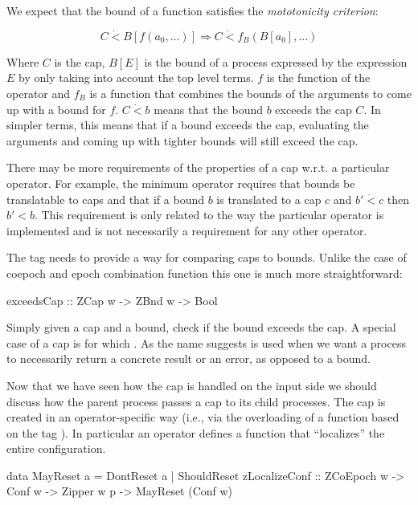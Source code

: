 We expect that the bound of a function satisfies the
\emph{mototonicity criterion}:

\[
C \dot{<} B[ f(a_0, ...)] \Rightarrow C \dot{<} f_B(B[a_0],...)
\]

Where \(C\) is the cap, \(B[E]\) is the bound of a process expressed
by the expression \(E\) by only taking into account the top level
terms. \(f\) is the function of the operator and \(f_B\) is a function
that combines the bounds of the arguments to come up with a bound for
\(f\). \(C \dot{<} b\) means that the bound \(b\) exceeds the cap
\(C\). In simpler terms, this means that if a bound exceeds the cap,
evaluating the arguments and coming up with tighter bounds will still
exceed the cap.

There may be more requirements of the properties of a cap w.r.t. a
particular operator. For example, the minimum operator requires that
bounds be translatable to caps and that if a bound \(b\) is translated
to a cap \(c\) and \(b' \dot{<} c\) then \(b' < b\). This requirement
is only related to the way the particular operator is implemented and
is not necessarily a requirement for any other operator.


The  tag  needs to provide a way for
comparing caps to bounds. Unlike the case of coepoch and epoch
combination function this one is much more straightforward:

\begin{haskellcode}
exceedsCap :: ZCap w -> ZBnd w -> Bool
\end{haskellcode}

Simply given a cap and a bound, check if the bound exceeds the cap. A
special case of a cap is  for which
. As the name suggests
 is used when we want a process to necessarily
return a concrete result or an error, as opposed to a bound.

Now that we have seen how the cap is handled on the input side we
should discuss how the parent process passes a cap to its child
processes. The cap is created in an operator-specific way (i.e., via the
overloading of a function based on the tag ). In particular an
operator defines a function that ``localizes'' the entire configuration.

\begin{haskellcode}
data MayReset a = DontReset a | ShouldReset
zLocalizeConf :: ZCoEpoch w -> Conf w -> Zipper w p -> MayReset (Conf w)
\end{haskellcode}

